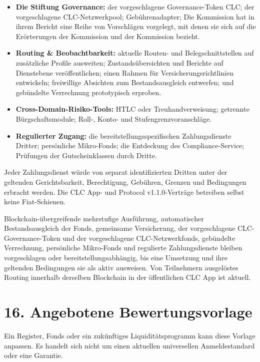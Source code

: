 \documentclass[11pt]{article}
\begin{document}
\begin{itemize}[leftmargin=*]
\item \textbf{Die Stiftung Governance:} der vorgeschlagene Governance-Token CLC; der vorgeschlagene CLC-Netzwerkpool; Gebührenadapter; Die Kommission hat in ihrem Bericht eine Reihe von Vorschlägen vorgelegt, mit denen sie sich auf die Erörterungen der Kommission und der Kommission bezieht.
\item \textbf{Routing \& Beobachtbarkeit:} aktuelle Routen- und Belegschnittstellen auf zusätzliche Profile ausweiten; Zustandsübersichten und Berichte auf Dienstebene veröffentlichen; einen Rahmen für Versicherungsrichtlinien entwickeln; freiwillige Absichten zum Bestandsausgleich entwerfen; und gebündelte Verrechnung prototypisch erproben.
\item \textbf{Cross-Domain-Risiko-Tools:} HTLC oder Treuhandverweisung; getrennte Bürgschaftsmodule; Roll-, Konto- und Stufengrenzvoranschläge.
\item \textbf{Regulierter Zugang:} die bereitstellungsspezifischen Zahlungsdienste Dritter; persönliche Mikro-Fonds; die Entdeckung des Compliance-Service; Prüfungen der Gutscheinklassen durch Dritte.
\end{itemize}
Jeder Zahlungsdienst würde von separat identifizierten Dritten unter der geltenden Gerichtsbarkeit, Berechtigung, Gebühren, Grenzen und Bedingungen erbracht werden. Die CLC App- und Protocol v1.1.0-Verträge betreiben selbst keine Fiat-Schienen.

Blockchain-übergreifende mehrstufige Ausführung, automatischer Bestandsausgleich der Fonds, gemeinsame Versicherung, der vorgeschlagene CLC-Governance-Token und der vorgeschlagene CLC-Netzwerkfonds, gebündelte Verrechnung, persönliche Mikro-Fonds und regulierte Zahlungsdienste bleiben vorgeschlagen oder bereitstellungsabhängig, bis eine Umsetzung und ihre geltenden Bedingungen sie als aktiv ausweisen. Von Teilnehmern ausgelöstes Routing innerhalb derselben Blockchain in der öffentlichen CLC App ist aktuell.


\section*{16. Angebotene Bewertungsvorlage}

Ein Register, Fonds oder ein zukünftiges Liquiditätsprogramm kann diese Vorlage anpassen. Es handelt sich nicht um einen aktuellen universellen Anmeldestandard oder eine Garantie.
\end{document}
